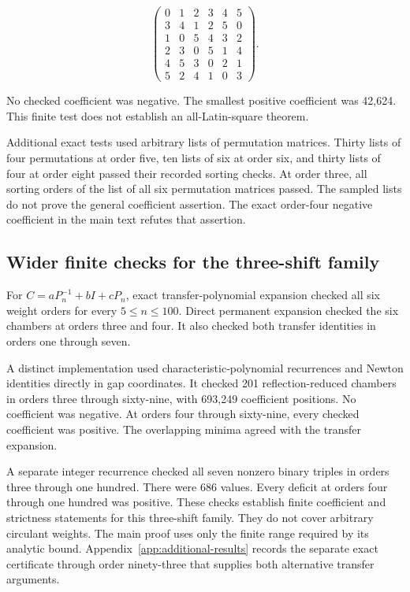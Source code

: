 \[
\begin{pmatrix}
0&1&2&3&4&5\\3&4&1&2&5&0\\1&0&5&4&3&2\\
2&3&0&5&1&4\\4&5&3&0&2&1\\5&2&4&1&0&3
\end{pmatrix}.
\]

No checked coefficient was negative. The smallest positive coefficient was 42,624. This finite test does not establish an all-Latin-square theorem.

Additional exact tests used arbitrary lists of permutation matrices. Thirty lists of four permutations at order five, ten lists of six at order six, and thirty lists of four at order eight passed their recorded sorting checks. At order three, all sorting orders of the list of all six permutation matrices passed. The sampled lists do not prove the general coefficient assertion. The exact order-four negative coefficient in the main text refutes that assertion.

\subsection{Wider finite checks for the three-shift family}\label{app:finite-2}

For \(C=aP_n^{-1}+bI+cP_n\), exact transfer-polynomial expansion checked all six weight orders for every \(5\le n\le100\). Direct permanent expansion checked the six chambers at orders three and four. It also checked both transfer identities in orders one through seven.

A distinct implementation used characteristic-polynomial recurrences and Newton identities directly in gap coordinates. It checked 201 reflection-reduced chambers in orders three through sixty-nine, with 693,249 coefficient positions. No coefficient was negative. At orders four through sixty-nine, every checked coefficient was positive. The overlapping minima agreed with the transfer expansion.

A separate integer recurrence checked all seven nonzero binary triples in orders three through one hundred. There were 686 values. Every deficit at orders four through one hundred was positive. These checks establish finite coefficient and strictness statements for this three-shift family. They do not cover arbitrary circulant weights. The main proof uses only the finite range required by its analytic bound. Appendix~\ref{app:additional-results} records the separate exact certificate through order ninety-three that supplies both alternative transfer arguments.

